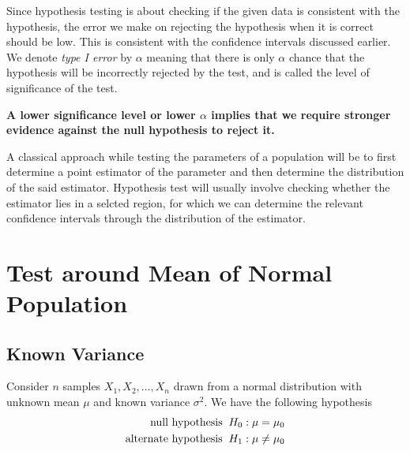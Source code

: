 \documentclass[../probability-notes.tex]{subfiles}
\begin{document}
    Since hypothesis testing is about checking if the given data is consistent with the hypothesis, the error we make on rejecting the hypothesis when it is correct should be low. This is consistent with the confidence intervals discussed earlier. We denote \emph{type I error} by $\alpha$ meaning that there is only $\alpha$ chance that the hypothesis will be incorrectly rejected by the test, and is called the level of significance of the test.\newline

    \textbf{A lower significance level or lower $\alpha$ implies that we require stronger evidence against the null hypothesis to reject it.}

    A classical approach while testing the parameters of a population will be to first determine a point estimator of the parameter and then determine the distribution of the said estimator. Hypothesis test will usually involve checking whether the estimator lies in a selcted region, for which we can determine the relevant confidence intervals through the distribution of the estimator.\newline

    
    \section{Test around Mean of Normal Population}
    \subsection{Known Variance}\label{sec:mean_normal_known_variance}
    Consider $n$ samples $X_{1}, X_{2}, \ldots, X_{n}$ drawn from a normal distribution with unknown mean $\mu$ and known variance $\sigma^{2}$. We have the following hypothesis
    \begin{align*}
        \text{null hypothesis \:} H_{0}&: \mu = \mu_{0}\\
        \text{alternate hypothesis \:} H_{1}&: \mu \neq \mu_{0}
    \end{align*}
\end{document}
